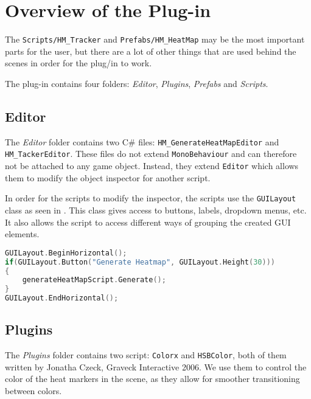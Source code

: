 \section{Overview of the Plug-in}
\label{Overview}

The \texttt{Scripts/HM\_Tracker} and \texttt{Prefabs/HM\_HeatMap} may be the most important parts for the user, but there are a lot of other things that are used behind the scenes in order for the plug/in to work.

The plug-in contains four folders: \textit{Editor}, \textit{Plugins}, \textit{Prefabs} and \textit{Scripts}.

\subsection{Editor}
\label{Overview_Folder_Editor}

The \textit{Editor} folder contains two C\# files: \texttt{HM\_GenerateHeatMapEditor} and \texttt{HM\_TackerEditor}. These files do not extend \texttt{MonoBehaviour} and can therefore not be attached to any game object. Instead, they extend \texttt{Editor} which allows them to modify the object inspector for another script. 

In order for the scripts to modify the inspector, the scripts use the \texttt{GUILayout} class as seen in . This class gives access to buttons, labels, dropdown menus, etc. It also allows the script to access different ways of grouping the created GUI elements.\\

\begin{lstlisting}[language=C]
GUILayout.BeginHorizontal();
if(GUILayout.Button("Generate Heatmap", GUILayout.Height(30)))
{
	generateHeatMapScript.Generate();
}
GUILayout.EndHorizontal();
\end{lstlisting}

\subsection{Plugins}
\label{Overview_Folder_Plugins}

The \textit{Plugins} folder contains two script: \texttt{Colorx} and \texttt{HSBColor}, both of them written by Jonatha Czeck, Graveck Interactive 2006. We use them to control the color of the heat markers in the scene, as they allow for smoother transitioning between colors.


